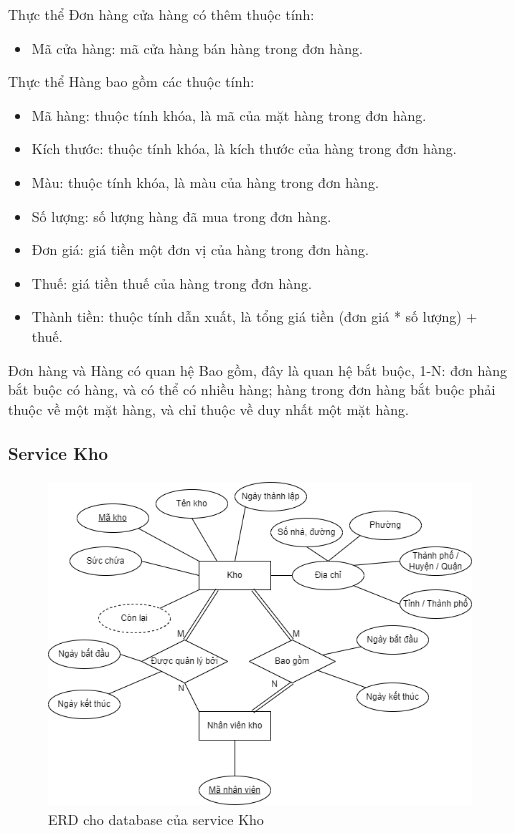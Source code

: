 \par Thực thể Đơn hàng cửa hàng có thêm thuộc tính:
\begin{itemize}
	\item Mã cửa hàng: mã cửa hàng bán hàng trong đơn hàng.
\end{itemize}

\par Thực thể Hàng bao gồm các thuộc tính:
\begin{itemize}
	\item Mã hàng: thuộc tính khóa, là mã của mặt hàng trong đơn hàng.
	\item Kích thước: thuộc tính khóa, là kích thước của hàng trong đơn hàng.
	\item Màu: thuộc tính khóa, là màu của hàng trong đơn hàng.
	\item Số lượng: số lượng hàng đã mua trong đơn hàng.
	\item Đơn giá: giá tiền một đơn vị của hàng trong đơn hàng.
	\item Thuế: giá tiền thuế của hàng trong đơn hàng.
	\item Thành tiền: thuộc tính dẫn xuất, là tổng giá tiền (đơn giá * số lượng) + thuế.
\end{itemize}

\par Đơn hàng và Hàng có quan hệ Bao gồm, đây là quan hệ bắt buộc, 1-N: đơn hàng bắt buộc có hàng, và có thể có nhiều hàng; hàng trong đơn hàng bắt buộc phải thuộc về một mặt hàng, và chỉ thuộc về duy nhất một mặt hàng.

\subsubsection{Service Kho}
\begin{figure}[!htp]
	\begin{center}
		\includegraphics[width=1\textwidth]{img/database/erd/shop_online-Kho.png}
		\newline
		\caption{ERD cho database của service Kho}
	\end{center}
\end{figure}

